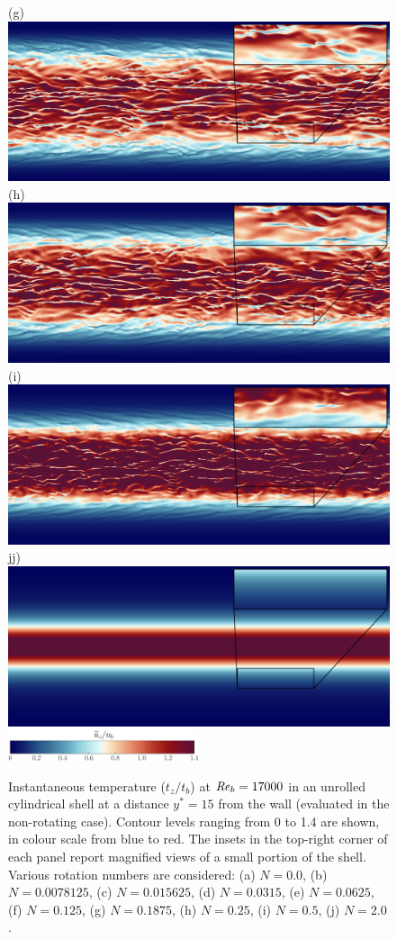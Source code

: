 \documentclass[lineno]{jfm}
\begin{document}
\begin{figure}
                (g) \includegraphics[width=6.cm]{Figures/unrolled_rotz0_roty0.1875_T.png} \\ 
                (h) \includegraphics[width=6.cm]{Figures/unrolled_rotz0_roty0.25_T.png} 
                (i) \includegraphics[width=6.cm]{Figures/unrolled_rotz0_roty0.5_T.png} \\
                jj) \includegraphics[width=6.cm]{Figures/unrolled_rotz0_roty1.0_T.png} 
		\\ \includegraphics[width=0.5\textwidth]{Figures/uz_cmap.eps}
		\caption{
			Instantaneous temperature ($t_z/t_b$) at $\mbox{\textit{Re}}_b = 17000$
			in an unrolled cylindrical shell at a distance
			$y^*=15$ from the wall (evaluated in the non-rotating case).
			Contour levels ranging from 0 to 1.4 are shown,
			in colour scale from blue to red. 
			The insets in the top-right corner of each panel report magnified views of a small portion of the shell.
			Various rotation numbers are considered:
                        (a) $N = 0.0$,
			(b) $N = 0.0078125$,
                        (c) $N = 0.015625$,
                        (d) $N = 0.0315$,
                        (e) $N = 0.0625$,
                        (f) $N = 0.125$,
			(g) $N = 0.1875$,
                        (h) $N = 0.25$,
                        (i) $N = 0.5$,
                        (j) $N = 2.0$.
		    }
			\label{fig:ttz_3000} 
	\end{figure}
	 
\end{document}
